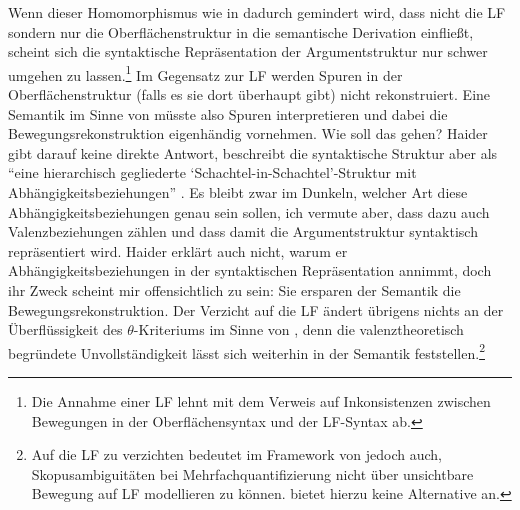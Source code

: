 {Wenn dieser Homomorphismus wie in \cite{Haider:04} dadurch gemindert wird, dass nicht die LF sondern nur die Oberflächenstruktur in die semantische Derivation einflie\ss t, scheint sich die syntaktische Repräsentation der Argumentstruktur nur schwer umgehen zu lassen.\footnote{Die Annahme einer LF lehnt \cite{Haider:04} mit dem Verweis auf Inkonsistenzen zwischen Bewegungen in der Oberflächensyntax und der LF-Syntax ab.} Im Gegensatz zur LF werden Spuren in der Oberflächenstruktur (falls es sie dort überhaupt gibt) nicht rekonstruiert. Eine Semantik im Sinne von \cite{Heim:Kratzer:98} müsste also Spuren interpretieren und dabei die Bewegungsrekonstruktion eigenhändig vornehmen. Wie soll das gehen? Haider gibt darauf keine direkte Antwort, beschreibt die syntaktische Struktur aber als "`eine hierarchisch gegliederte `Schachtel-in-Schachtel'-Struktur mit Abhängigkeitsbeziehungen"' \citep[73]{Haider:04}. Es bleibt zwar im Dunkeln, welcher Art diese Abhängigkeitsbeziehungen genau sein sollen, ich vermute aber, dass dazu auch Valenzbeziehungen zählen und dass damit die Argumentstruktur syntaktisch repräsentiert wird. Haider erklärt auch nicht, warum er Abhängigkeitsbeziehungen in der syntaktischen Repräsentation annimmt, doch ihr Zweck scheint 	mir offensichtlich zu sein: Sie ersparen der Semantik die Bewegungsrekonstruktion. Der Verzicht auf die LF ändert übrigens nichts an der Überflüssigkeit des $\theta$-Kriteriums im Sinne von \cite{Heim:Kratzer:98}, denn die valenztheoretisch begründete Unvollständigkeit lässt sich weiterhin in der Semantik feststellen.\footnote{Auf die LF zu verzichten bedeutet im Framework von \cite{Heim:Kratzer:98} jedoch auch, Skopusambiguitäten bei Mehrfachquantifizierung nicht über unsichtbare Bewegung auf LF modellieren zu können. \cite{Haider:04} bietet hierzu keine Alternative an.}  

}
